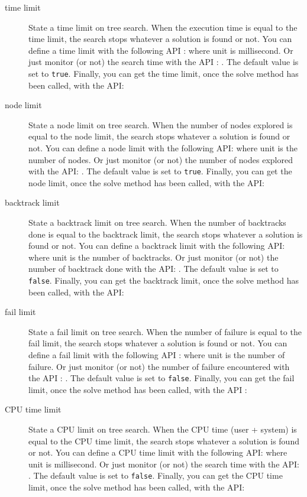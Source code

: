 \begin{description}
\item[time limit] State a time limit on tree search. When the execution time is equal to the time limit, the search stops whatever a solution is found or not. You can define a time limit with the following API :  where unit is millisecond. Or just monitor (or not) the search time with the API : . The default value is set to \texttt{true}. Finally, you can get the time limit, once the solve method has been called, with the API:  
\item[node limit] State a node limit on tree search. When the number of nodes explored is equal to the node limit, the search stops whatever a solution is found or not. You can define a node limit with the following API:  where unit is the number of nodes. Or just monitor (or not) the number of nodes explored with the API: . The default value is set to \texttt{true}. Finally, you can get the node limit, once the solve method has been called, with the API:  
\item[backtrack limit] State a backtrack limit on tree search. When the number of backtracks done is equal to the backtrack limit, the search stops whatever a solution is found or not. You can define a backtrack limit with the following API:  where unit is the number of backtracks. Or just monitor (or not) the number of backtrack done with the API: . The default value is set to \texttt{false}. Finally, you can get the backtrack limit, once the solve method has been called, with the API:  
\item[fail limit] State a fail limit on tree search. When the number of failure is equal to the fail limit, the search stops whatever a solution is found or not. You can define a fail limit with the following API :  where unit is the number of failure. Or just monitor (or not) the number of failure encountered with the API : . The default value is set to \texttt{false}. Finally, you can get the fail limit, once the solve method has been called, with the API :  
\item[CPU time limit] State a CPU limit on tree search. When the CPU time (user + system) is equal to the CPU time limit, the search stops whatever a solution is found or not. You can define a CPU time limit with the following API:  where unit is millisecond. Or just monitor (or not) the search time with the API: . The default value is set to \texttt{false}. Finally, you can get the CPU time limit, once the solve method has been called, with the API:  
\end{description}

